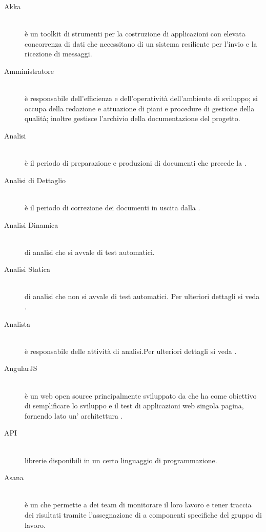 \documentclass[12pt,a4paper]{article}
\begin{document}
\begin{description}
\item[Akka] 
\hfill\\è un toolkit di strumenti per la costruzione di applicazioni con elevata concorrenza di dati che necessitano di un sistema resiliente per l'invio e la ricezione di messaggi.

\item[Amministratore] 
\hfill\\è responsabile dell'efficienza e dell'operatività dell'ambiente di sviluppo; si occupa della redazione e attuazione di piani e procedure di gestione della qualità; inoltre gestisce l'archivio della documentazione del progetto.

\item[Analisi]
\hfill\\è il periodo di preparazione e produzioni di documenti che precede la \RR.

\item[Analisi di Dettaglio]
\hfill\\è il periodo di correzione dei documenti in uscita dalla \RR.

\item[Analisi Dinamica]
\hfill\\  di analisi che si avvale di test automatici.

\item[Analisi Statica]
\hfill\\  di analisi che non si avvale di test automatici. Per ulteriori dettagli si veda \PdQ{}.

\item[Analista]
\hfill\\è responsabile delle attività di analisi.Per ulteriori dettagli si veda \PdQ{}.

\item[AngularJS]
\hfill\\è un  web open source principalmente sviluppato da  che ha come obiettivo di semplificare lo sviluppo e il test di applicazioni web singola pagina, fornendo lato  un' architettura .

\item[API]
\hfill\\librerie {} disponibili in un certo linguaggio di programmazione.

\item[Asana]
\hfill\\è un  che permette a dei team di monitorare il loro lavoro e tener traccia dei risultati tramite l'assegnazione di  a componenti specifiche del gruppo di lavoro.


\end{description}
\end{document}
